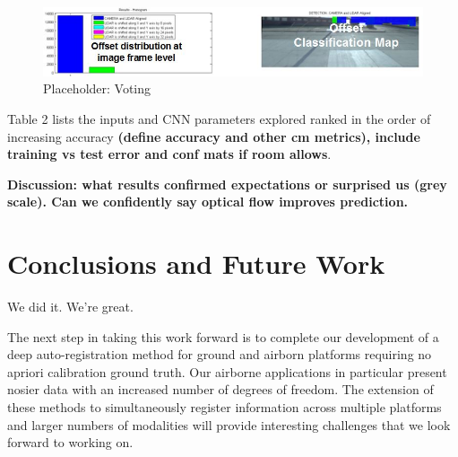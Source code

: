 \documentclass{article}
\begin{document}
\begin{figure}[htbp]
    \centering
        \includegraphics[scale=0.85]{Figures/Voting_5class.jpg}
    \caption{Placeholder: Voting}
    \label{fig:Figures_Voting}
\end{figure}

Table 2 lists the inputs and CNN parameters explored ranked in the order of increasing accuracy \textbf{(define accuracy and other cm metrics), include training vs test error and conf mats if room allows}.  

 \textbf{Discussion: what results confirmed expectations or surprised us (grey scale). Can we confidently say optical flow improves prediction. }



\section{Conclusions and Future Work} %
\label{sec:conclusions_and_future_work}
We did it. We're great.

The next step in taking this work forward is to complete our development of a deep auto-registration method for ground and airborn platforms requiring no apriori calibration ground truth.  Our airborne applications in particular present nosier data with an increased number of degrees of freedom. The extension of these methods to simultaneously register information across multiple platforms and larger numbers of modalities will provide interesting challenges that we look forward to working on. 






\end{document}
